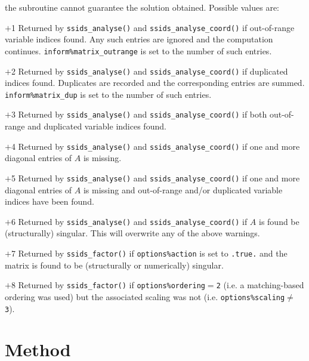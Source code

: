 the subroutine cannot guarantee the solution obtained.
Possible values are:
\begin{description}
\item{$+$1} Returned by {\tt ssids\_analyse()}
and {\tt ssids\_analyse\_coord()} if out-of-range variable
indices found.
Any such entries are ignored  and the computation continues.
{\tt inform\%matrix\_outrange} is set to the number of such entries.

\item{$+$2} Returned by {\tt ssids\_analyse()} and {\tt ssids\_analyse\_coord()}
if duplicated indices found. Duplicates are recorded and the corresponding
entries are summed. {\tt inform\%matrix\_dup} is set to the number of such entries.

\item{$+$3} Returned by {\tt ssids\_analyse()} and {\tt ssids\_analyse\_coord()} if both
out-of-range and duplicated variable indices found.

\item{$+$4} Returned by {\tt ssids\_analyse()}  and {\tt ssids\_analyse\_coord()}
if  one and more diagonal entries
of $A$ is missing.

\item{$+$5} Returned by {\tt ssids\_analyse()}  and {\tt ssids\_analyse\_coord()}
if  one and more diagonal entries
of $A$ is missing  and
out-of-range and/or duplicated variable indices have been found.

\item{$+$6} Returned by {\tt ssids\_analyse()}  and {\tt ssids\_analyse\_coord()} if
$A$ is found be (structurally) singular. This will overwrite any of the above warnings.

\item{$+$7} Returned by {\tt ssids\_factor()} if {\tt options\%action} is set
to {\tt .true.} and the matrix is found to be (structurally or numerically)
singular.

\item{$+$8} Returned by {\tt ssids\_factor()} if
{\tt options\%ordering}$=${\tt 2} (i.e.
a matching-based ordering was used) but the associated scaling was not (i.e. {\tt options\%scaling}$\ne$
{\tt 3}).

\end{description}

\section{Method} \label{method}

